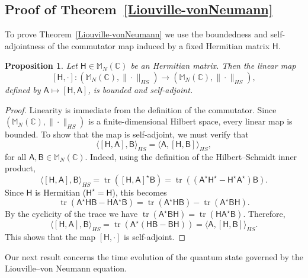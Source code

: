 \documentclass[a4paper,11pt]{article}
\newtheorem{proposition}[theorem]{Proposition}
\newcommand{\rH}{\mathsf{H}}
\newcommand{\rA}{\mathsf{A}}
\newcommand{\rB}{\mathsf{B}}
\begin{document}
\begin{appendices}

\section{Proof of Theorem~\ref{Liouville-vonNeumann}}\label{Appendix_1}

To prove Theorem~\ref{Liouville-vonNeumann} we use the boundedness and self-adjointness of the commutator map induced by a fixed Hermitian matrix \(\rH\).

\begin{proposition}\label{bounded}
Let \(\rH \in \mathbb{M}_N(\mathbb{C})\) be an Hermitian matrix. Then the linear map 
\[
[\rH,\cdot] : (\mathbb{M}_N(\mathbb{C}), \|\cdot\|_{HS}) \longrightarrow (\mathbb{M}_N(\mathbb{C}), \|\cdot\|_{HS}),
\]
defined by \(\rA \mapsto [\rH,\rA]\), is bounded and self-adjoint.
\end{proposition}

\begin{proof}
Linearity is immediate from the definition of the commutator. Since \((\mathbb{M}_N(\mathbb{C}), \|\cdot\|_{HS})\) is a finite-dimensional Hilbert space, every linear map is bounded. To show that the map is self-adjoint, we must verify that
\[
\langle [\rH,\rA], \rB \rangle_{HS} = \langle \rA, [\rH,\rB] \rangle_{HS},
\]
for all \(\rA, \rB \in \mathbb{M}_N(\mathbb{C})\). Indeed, using the definition of the Hilbert--Schmidt inner product,
\[
\langle [\rH,\rA], \rB \rangle_{HS} = \operatorname{tr}\left([\rH,\rA]^\star \rB\right)
= \operatorname{tr}\left((\rA^\star \rH^\star - \rH^\star \rA^\star)\rB\right).
\]
Since \(\rH\) is Hermitian (\(\rH^\star=\rH\)), this becomes
\[
\operatorname{tr}\left(\rA^\star \rH \rB - \rH \rA^\star \rB\right)
= \operatorname{tr}\left(\rA^\star \rH \rB\right) - \operatorname{tr}\left(\rA^\star \rB \rH\right).
\]
By the cyclicity of the trace we have
\(
\operatorname{tr}\left(\rA^\star \rB \rH\right) = \operatorname{tr}\left(\rH\rA^\star \rB\right).
\)
Therefore, 
\[
\langle [\rH,\rA], \rB \rangle_{HS} = \operatorname{tr}\left(\rA^\star (\rH \rB - \rB\rH)\right)
= \langle \rA, [\rH,\rB] \rangle_{HS}.
\]
This shows that the map \( [\rH,\cdot] \) is self-adjoint.
\end{proof}

\bigskip

Our next result concerns the time evolution of the quantum state governed by the Liouville–von Neumann equation.


\end{appendices}
\end{document}
